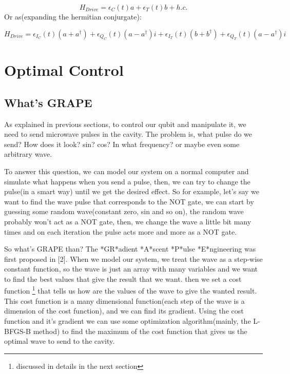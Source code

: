 \documentclass{article}
\numberwithin{equation}{section}
\begin{document}
\begin{equation}
H_{Drive} = \epsilon_C(t)a + \epsilon_T(t)b + h.c.
\end{equation}
Or as(expanding the hermitian conjurgate):

\begin{equation}
H_{Drive} = \epsilon_{I_C}(t)(a + a^\dag{}) + \epsilon_{Q_C}(t)(a - a^\dag{})i + \epsilon_{I_T}(t)(b + b^\dag{})+ \epsilon_{Q_T}(t)(a - a^\dag{})i
\end{equation}

\newpage
\section{Optimal Control}

\subsection{What's GRAPE} %
As explained in previous sections, to control our qubit and manipulate it, we need to send microwave pulses in the cavity. The problem is, what pulse do we send? How does it look? sin? cos? In what frequency? or maybe even some arbitrary wave. \par
To answer this question, we can model our system on a normal computer and simulate what happens when you send a pulse, then, we can try to change the pulse(in a smart way) until we get the desired effect. So for example, let's say we want to find the wave pulse that corresponds to the NOT gate, we can start by guessing some random wave(constant zero, sin and so on), the random wave probably won't act as a NOT gate, then, we change the wave a little bit many times and on each iteration the pulse acts more and more as a NOT gate.\par
So what's GRAPE than? The *GR*adient *A*scent *P*ulse *E*ngineering was first proposed in [2]. When we model our system, we treat the wave as a step-wise constant function, so the wave is just an array with many variables and we want to find the best values that give the result that we want. then we set a cost function \footnote{discussed in details in the next section} that tells us how are the values of the wave to give the wanted result. This cost function is a many dimensional function(each step of the wave is a dimension of the cost function), and we can find its gradient. Using the cost function and it's gradient we can use some optimization algorithm(mainly, the L-BFGS-B method) to find the maximum of the cost function that gives us the optimal wave to send to the cavity.
\end{document}
